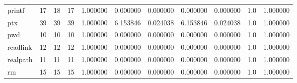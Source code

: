 \begin{tabular}{lrrrrrrrrrr}
printf    &                                      17 &                 18 &                                17 &                                   1.000000 &                               0.000000 &                                     0.000000 &                          0.000000 &                                0.000000 &                                1.0 &                                           1.000000 \\
ptx       &                                      39 &                 39 &                                39 &                                   1.000000 &                               6.153846 &                                     0.024038 &                          6.153846 &                                0.024038 &                                1.0 &                                           1.000000 \\
pwd       &                                      10 &                 10 &                                10 &                                   1.000000 &                               0.000000 &                                     0.000000 &                          0.000000 &                                0.000000 &                                1.0 &                                           1.000000 \\
readlink  &                                      12 &                 12 &                                12 &                                   1.000000 &                               0.000000 &                                     0.000000 &                          0.000000 &                                0.000000 &                                1.0 &                                           1.000000 \\
realpath  &                                      11 &                 11 &                                11 &                                   1.000000 &                               0.000000 &                                     0.000000 &                          0.000000 &                                0.000000 &                                1.0 &                                           1.000000 \\
rm        &                                      15 &                 15 &                                15 &                                   1.000000 &                               0.000000 &                                     0.000000 &                          0.000000 &                                0.000000 &                                1.0 &                                           1.000000 \\

\end{tabular}
